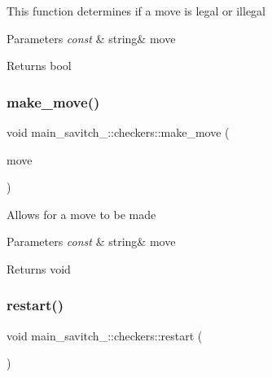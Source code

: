 This function determines if a move is legal or illegal 
\begin{DoxyParams}{Parameters}
{\em const} & string\& move \\
\hline
\end{DoxyParams}
\begin{DoxyReturn}{Returns}
bool 
\end{DoxyReturn}
\mbox{\label{classmain__savitch__14_1_1checkers_a8a08c0555d5b8c264472cc94a2f007e3}} 
\subsubsection{\texorpdfstring{make\+\_\+move()}{make\_move()}}
{\footnotesize\ttfamily void main\+\_\+savitch\+\_\+::checkers\+::make\+\_\+move (\begin{DoxyParamCaption}\item[{const string \&}]{move }\end{DoxyParamCaption})}

Allows for a move to be made 
\begin{DoxyParams}{Parameters}
{\em const} & string\& move \\
\hline
\end{DoxyParams}
\begin{DoxyReturn}{Returns}
void 
\end{DoxyReturn}
\mbox{\label{classmain__savitch__14_1_1checkers_ad3ee0adbdabda9136ecd46b958c83d24}} 
\subsubsection{\texorpdfstring{restart()}{restart()}}
{\footnotesize\ttfamily void main\+\_\+savitch\+\_\+::checkers\+::restart (\begin{DoxyParamCaption}{ }\end{DoxyParamCaption})\hspace{0.3cm}{\ttfamily [virtual]}}

